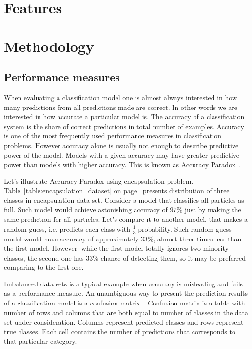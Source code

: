 \documentclass[a4paper, 11pt, table]{article}
\begin{document}
\section{Features}

\section{Methodology}

\subsection{Performance measures}

When evaluating a classification model one is almost always interested in how many predictions from all predictions made are correct. In other words we are interested in how accurate a particular model is. The accuracy of a classification system is the share of correct predictions in total number of examples. Accuracy  is one of the most frequently used performance measures in classification problems. However accuracy alone is usually not enough to describe predictive power of the model. Models with a given accuracy may have greater predictive power than models with higher accuracy. This is known as Accuracy Paradox~\cite{zhu2007knowledge}.

Let's illustrate Accuracy Paradox using encapsulation problem. Table~\ref{table:encapsulation_dataset} on page~\pageref{table:encapsulation_dataset} presents distribution of three classes in encapsulation data set. Consider a model that classifies all particles as full. Such model would achieve astonishing accuracy of $97\%$ just by making the same prediction for all particles. Let's compare it to another model, that makes a random guess, i.e. predicts each class with $\frac{1}{3}$ probability. Such random guess model would have accuracy of approximately $33\%$, almost three times less than the first model. However, while the first model totally ignores two minority classes, the second one has $33\%$ chance of detecting them, so it may be preferred comparing to the first one. 

Imbalanced data sets is a typical example when accuracy is misleading and fails as a performance measure. An unambiguous way to present the prediction results of a classification model is a confusion matrix~\cite{STEHMAN199777}. Confusion matrix is a table with number of rows and columns that are both equal to number of classes in the data set under consideration. Columns represent predicted classes and rows represent true classes. Each cell contains the number of predictions that corresponds to that particular category. 
\end{document}
